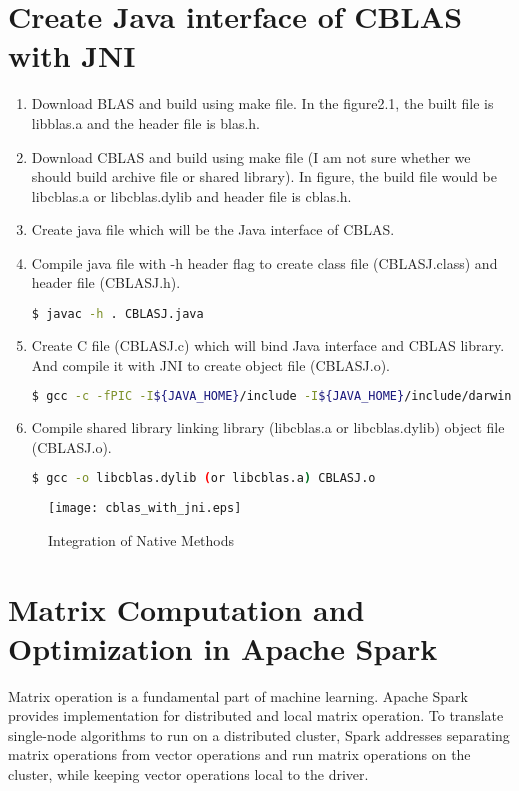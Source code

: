 \section{Create Java interface of CBLAS with JNI}
\label{sec:history}
\begin{enumerate}
    \item Download BLAS and build using make file. In the figure2.1, the built file is libblas.a and the header file is blas.h.
    \item Download CBLAS and build using make file (I am not sure whether we should build archive file or shared library). In figure, the build file would be libcblas.a or libcblas.dylib and header file is cblas.h.
    \item Create java file which will be the Java interface of CBLAS.
    \item Compile java file with -h header flag to create class file (CBLASJ.class) and header file (CBLASJ.h).
\begin{lstlisting}[language=bash]
    $ javac -h . CBLASJ.java
\end{lstlisting}
    \item Create C file (CBLASJ.c) which will bind Java interface and CBLAS library. And compile it with JNI to create object file (CBLASJ.o).
\begin{lstlisting}[language=bash]
    $ gcc -c -fPIC -I${JAVA_HOME}/include -I${JAVA_HOME}/include/darwin CBLASJ.c
\end{lstlisting}
    \item Compile shared library linking library (libcblas.a or libcblas.dylib) object file (CBLASJ.o).
\begin{lstlisting}[language=bash]
    $ gcc -o libcblas.dylib (or libcblas.a) CBLASJ.o 
\end{lstlisting}
\end{enumerate}

\begin{figure}[htb]
    \texttt{[image: cblas\_with\_jni.eps]}
    \caption{Integration of Native Methods }
    \label{fig:Sampling}
\end{figure}



\section{Matrix Computation and Optimization in Apache Spark}
\label{sec:history}

Matrix operation is a fundamental part of machine learning. Apache Spark provides implementation for distributed and local matrix operation. 
To translate single-node algorithms to run on a distributed cluster, Spark addresses separating matrix operations from vector operations and run matrix operations on the cluster, 
while keeping vector operations local to the driver. 

